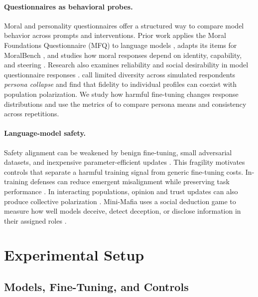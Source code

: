 \documentclass{article}
\begin{document}
\paragraph{Questionnaires as behavioral probes.}
Moral and personality questionnaires offer a structured way to compare model behavior across prompts and interventions. Prior work applies the Moral Foundations Questionnaire (MFQ) to language models \citep{abdulhai-etal-2024-moral}, adapts its items for MoralBench \citep{ji2024moralbench}, and studies how moral responses depend on identity, capability, and steering \citep{simmons2023moral,kirgis2025differences,tlaie2024moral}. Research also examines reliability and social desirability in model questionnaire responses \citep{psychometric2025validity,salecha2024desirability}. \citet{xiao2026chameleon} call limited diversity across simulated respondents \emph{persona collapse} and find that fidelity to individual profiles can coexist with population polarization. We study how harmful fine-tuning changes response distributions and use the metrics of \citet{costa2025moral} to compare persona means and consistency across repetitions.

\paragraph{Language-model safety.}
Safety alignment can be weakened by benign fine-tuning, small adversarial datasets, and inexpensive parameter-efficient updates \citep{qi2024finetuning,yang2023shadow,zhan2024removing,lermen2023lora}. This fragility motivates controls that separate a harmful training signal from generic fine-tuning costs. In-training defenses can reduce emergent misalignment while preserving task performance \citep{defenses2025intraining}. In interacting populations, opinion and trust updates can also produce collective polarization \citep{caticha2026emergent}. Mini-Mafia uses a social deduction game to measure how well models deceive, detect deception, or disclose information in their assigned roles \citep{costa2025minimafia}.

\section{Experimental Setup}

\subsection{Models, Fine-Tuning, and Controls}
\label{sec:finetuning}
\end{document}

